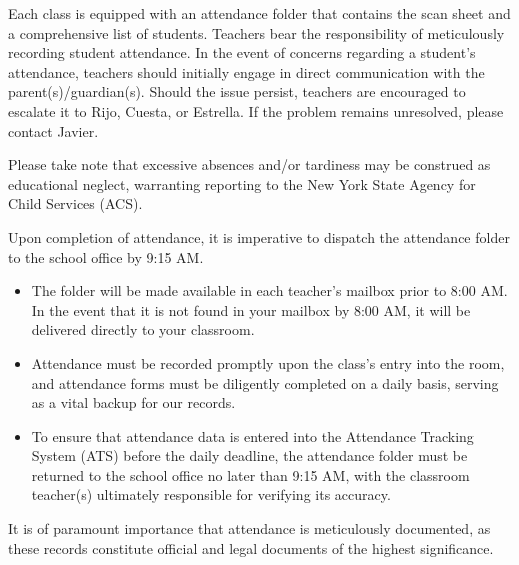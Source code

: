 \documentclass[11pt]{article}
\begin{document}
Each class is equipped with an attendance folder that contains the scan sheet and a comprehensive list of students. Teachers bear the responsibility of meticulously recording student attendance. In the event of concerns regarding a student’s attendance, teachers should initially engage in direct communication with the parent(s)/guardian(s). Should the issue persist, teachers are encouraged to escalate it to Rijo, Cuesta, or Estrella. If the problem remains unresolved, please contact Javier.

Please take note that excessive absences and/or tardiness may be construed as educational neglect, warranting reporting to the New York State Agency for Child Services (ACS).

Upon completion of attendance, it is imperative to dispatch the attendance folder to the school office by 9:15 AM.

\begin{itemize}
\item The folder will be made available in each teacher’s mailbox prior to 8:00 AM. In the event that it is not found in your mailbox by 8:00 AM, it will be delivered directly to your classroom.

\item Attendance must be recorded promptly upon the class’s entry into the room, and attendance forms must be diligently completed on a daily basis, serving as a vital backup for our records.

\item To ensure that attendance data is entered into the Attendance Tracking System (ATS) before the daily deadline, the attendance folder must be returned to the school office no later than 9:15 AM, with the classroom teacher(s) ultimately responsible for verifying its accuracy.
\end{itemize}

It is of paramount importance that attendance is meticulously documented, as these records constitute official and legal documents of the highest significance.
\end{document}
